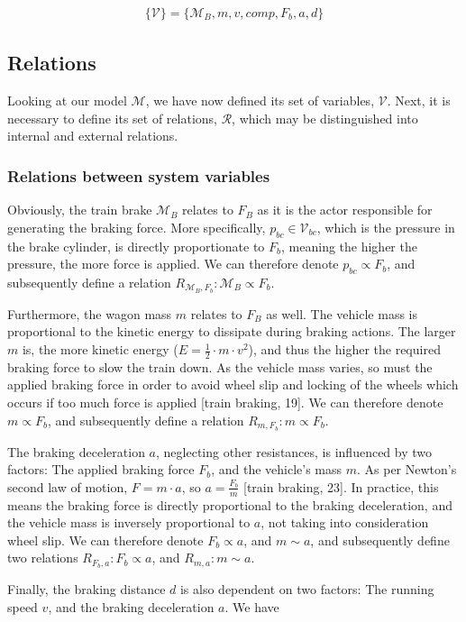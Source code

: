 \begin{align*}
\{ {\mathcal{V}} \} = \{ {\mathcal{M}}_{B},m,v,comp,F_{b},a,d \}
\end{align*}

\subsection{Relations}
\label{sec:Relations}
\par\noindent
Looking at our model ${\mathcal{M}}$, we have now defined its set of variables, ${\mathcal{V}}$. Next, it is necessary to define its set of relations, ${\mathcal{R}}$, which may be distinguished into internal and external relations.

\subsubsection{Relations between system variables}
\label{sec:RelationsSystemVariables}
\par\noindent
Obviously, the train brake ${\mathcal{M}}_{B}$ relates to $F_{B}$ as it is the actor responsible for generating the braking force. More specifically, $p_{bc} \in {\mathcal{V}}_{bc}$, which is the pressure in the brake cylinder, is directly proportionate to $F_{b}$, meaning the higher the pressure, the more force is applied. We can therefore denote $p_{bc} \propto F_{b}$, and subsequently define a relation $R_{{\mathcal{M}}_{B},F_{b}}: {\mathcal{M}}_{B} \propto F_{b}$.
\par
Furthermore, the wagon mass $m$ relates to $F_{B}$ as well. The vehicle mass is proportional to the kinetic energy to dissipate during braking actions. The larger $m$ is, the more kinetic energy ($E=\frac{1}{2} \cdot m \cdot v^{2}$), and thus the higher the required braking force to slow the train down. As the vehicle mass varies, so must the applied braking force in order to avoid wheel slip and locking of the wheels which occurs if too much force is applied [train braking, 19]. We can therefore denote $m \propto F_{b}$, and subsequently define a relation $R_{m,F_{b}}: m \propto F_{b}$.
\par
The braking deceleration $a$, neglecting other resistances, is influenced by two factors: The applied braking force $F_{b}$, and the vehicle's mass $m$. As per Newton's second law of motion, $F=m \cdot a$, so $a=\frac{F_{b}}{m}$ [train braking, 23]. In practice, this means the braking force is directly proportional to the braking deceleration, and the vehicle mass is inversely proportional to $a$, not taking into consideration wheel slip. We can therefore denote $F_{b} \propto a$, and $m \sim a$, and subsequently define two relations $R_{F_{b},a}: F_{b} \propto a$, and $R_{m,a}: m \sim a$.
\par
Finally, the braking distance $d$ is also dependent on two factors: The running speed $v$, and the braking deceleration $a$.  We have 

